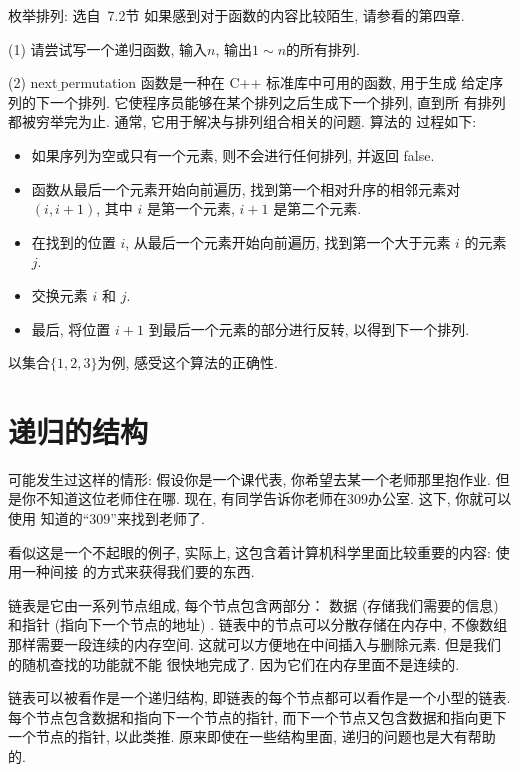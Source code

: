    \begin{exercise}{枚举排列: 选自\cite{liu2014}~7.2节}
        如果感到对于函数的内容比较陌生, 请参看\cite{liu2014}的第四章. 
        
        (1) 请尝试写一个递归函数, 输入$n$, 输出$1\sim n$的所有排列. 

        (2) next$\underline~$permutation 函数是一种在 C++ 标准库中可用的函数, 用于生成
        给定序列的下一个排列. 它使程序员能够在某个排列之后生成下一个排列, 直到所
        有排列都被穷举完为止. 通常, 它用于解决与排列组合相关的问题. 算法的
        过程如下: 
        \begin{itemize}[noitemsep]
            \item 如果序列为空或只有一个元素, 则不会进行任何排列, 并返回 false. 
            \item 函数从最后一个元素开始向前遍历, 找到第一个相对升序的相邻元素对 $(i, i+1)$, 其中 $i$ 是第一个元素, $i+1$ 是第二个元素. 
            \item 在找到的位置 $i$, 从最后一个元素开始向前遍历, 找到第一个大于元素 $i$ 的元素 $j$. 
            \item 交换元素 $i$ 和 $j$. 
            \item 最后, 将位置 $i+1$ 到最后一个元素的部分进行反转, 以得到下一个排列. 
        \end{itemize}
        以集合$\{1,2,3\}$为例, 感受这个算法的正确性. 
    \end{exercise}

\newpage
\section{递归的结构}

 可能发生过这样的情形: 假设你是一个课代表, 你希望去某一个老师那里抱作业. 
但是你不知道这位老师住在哪. 现在, 有同学告诉你老师在309办公室. 这下, 你就可以使用
知道的``309''来找到老师了. 

看似这是一个不起眼的例子, 实际上, 这包含着计算机科学里面比较重要的内容: 使用一种间接
的方式来获得我们要的东西. 

 链表是它由一系列节点组成, 每个节点包含两部分：
数据 (存储我们需要的信息) 和指针 (指向下一个节点的地址) . 
链表中的节点可以分散存储在内存中, 不像数组那样需要一段连续的内存空间. 
这就可以方便地在中间插入与删除元素. 但是我们的随机查找的功能就不能
很快地完成了. 因为它们在内存里面不是连续的. 

链表可以被看作是一个递归结构, 即链表的每个节点都可以看作是一个小型的链表. 
每个节点包含数据和指向下一个节点的指针, 而下一个节点又包含数据和指向更下一个节点的指针, 
以此类推. 
原来即使在一些结构里面, 递归的问题也是大有帮助的. 


